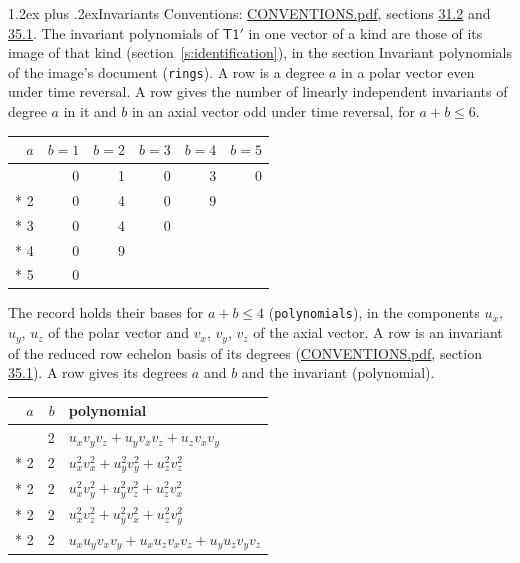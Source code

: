 \documentclass[10pt,a4paper]{article}
\makeatletter
\renewcommand\section{\@startsection{section}{1}{\z@}{-3ex plus -1ex minus -.2ex}%
  {1.2ex plus .2ex}{\normalfont\large\sffamily\bfseries\color{parttitle}}}
\numberwithin{equation}{section}
\newcommand{\grp}[1]{\mathsf{#1}}
\makeatother
\begin{document}
\section{Invariants}\label{s:invariants}
Conventions: \href{../../CONVENTIONS.pdf}{CONVENTIONS.pdf}, sections \href{../../CONVENTIONS.pdf\#conv.31.2}{31.2} and \href{../../CONVENTIONS.pdf\#conv.35.1}{35.1}.
The invariant polynomials of $\grp{T1'}$ in one vector of a kind are those of its image of that kind (section~\ref{s:identification}), in the section Invariant polynomials of the image's document (\texttt{rings}).
\leavevmode\label{n:index.degree.polar}\label{n:index.degree.axial}A row is a degree $a$ in a polar vector even under time reversal. A row gives the number of linearly independent invariants of degree $a$ in it and $b$ in an axial vector odd under time reversal, for $a + b \le 6$.
{\small\begin{longtable}{@{}rrrrrr@{}}\toprule
$a$ & $b = 1$ & $b = 2$ & $b = 3$ & $b = 4$ & $b = 5$\\\midrule\endhead
\bottomrule\endfoot\endlastfoot
1 & 0 & 1 & 0 & 3 & 0\\*
2 & 0 & 4 & 0 & 9 & \\*
3 & 0 & 4 & 0 &  & \\*
4 & 0 & 9 &  &  & \\*
5 & 0 &  &  &  & \\
\bottomrule\end{longtable}}
\leavevmode\label{n:local.component.polar}\label{n:local.component.axial}The record holds their bases for $a + b \le 4$ (\texttt{polynomials}), in the components $u_{x}$, $u_{y}$, $u_{z}$ of the polar vector and $v_{x}$, $v_{y}$, $v_{z}$ of the axial vector. \label{n:head.polynomial}A row is an invariant of the reduced row echelon basis of its degrees (\href{../../CONVENTIONS.pdf}{CONVENTIONS.pdf}, section \href{../../CONVENTIONS.pdf\#conv.35.1}{35.1}). A row gives its degrees $a$ and $b$ and the invariant (polynomial).
{\small\renewcommand{\arraystretch}{1.2}\begin{longtable}{@{}rrl@{}}\toprule
$a$ & $b$ & polynomial\\\midrule\endhead
\bottomrule\endfoot\endlastfoot
1 & 2 & $u_{x}v_{y}v_{z} + u_{y}v_{x}v_{z} + u_{z}v_{x}v_{y}$\\*
2 & 2 & $u_{x}^{2}v_{x}^{2} + u_{y}^{2}v_{y}^{2} + u_{z}^{2}v_{z}^{2}$\\*
2 & 2 & $u_{x}^{2}v_{y}^{2} + u_{y}^{2}v_{z}^{2} + u_{z}^{2}v_{x}^{2}$\\*
2 & 2 & $u_{x}^{2}v_{z}^{2} + u_{y}^{2}v_{x}^{2} + u_{z}^{2}v_{y}^{2}$\\*
2 & 2 & $u_{x}u_{y}v_{x}v_{y} + u_{x}u_{z}v_{x}v_{z} + u_{y}u_{z}v_{y}v_{z}$\\
\bottomrule\end{longtable}}
\end{document}
